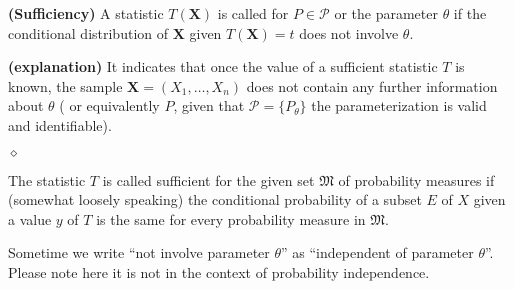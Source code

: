 \documentclass{article}
\newcommand{\bfs}[1]{\textbf{({#1}) }}
\begin{document}
\begin{defa}\bfs{Sufficiency}
 A statistic $T(\mathbf{X})$ is called  for $P \in \mathcal{P}$ or the parameter $\theta$ if the conditional distribution of $\mathbf{X}$ given $T(\mathbf{X})=t$ does not involve $\theta$. 
\end{defa}
\begin{rema}\bfs{explanation}
It indicates that once the value of a sufficient statistic $T$ is known, the sample $\mathbf{X}=\left(X_{1}, \ldots, X_{n}\right)$ does not contain any further information about $\theta$ ( or equivalently $P$, given that $\mathcal{P}=\{P_{\theta}\}$ the parameterization is valid and identifiable). 
 
$\diamond$ 

The statistic $T$ is called sufficient for the given set $\mathfrak{M}$ of probability measures if (somewhat loosely speaking) the conditional probability of a subset $E$ of $X$ given a value $y$ of $T$ is the same for every probability measure in $\mathfrak{M}$.
\end{rema}
\begin{rema}
Sometime we write ``not involve parameter $\theta$'' as ``independent of parameter $\theta$''. Please note here it is not in the context of probability independence.
\end{rema}
\end{document}
